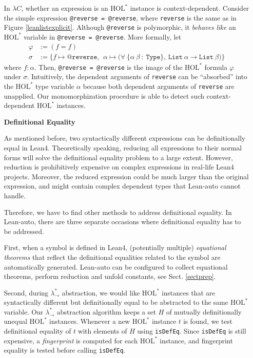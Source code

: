   In $\lambda C$, whether an expression is an $\text{HOL}^*$ instance is context-dependent.
Consider the simple expression \texttt{@reverse = @reverse}, where \texttt{reverse}
is the same as in Figure \ref{leanlistexplicit}. Although \texttt{@reverse} is polymorphic,
it \textit{behaves like} an $\text{HOL}^*$ variable in \texttt{@reverse = @reverse}. More formally,
let
$$\begin{aligned}
\varphi &:= (f = f) \\
\sigma  &:= \{f \mapsto \texttt{@reverse}, \ \ \alpha \mapsto \texttt{(} \forall \ \texttt{\{}\alpha \ \beta \ : \ \texttt{Type\}}, \ 
  \texttt{List} \ \alpha \to \texttt{List} \ \beta \texttt{)}\}
\end{aligned}$$
where $f : \alpha$. Then, \texttt{@reverse = @reverse} is the image of the $\text{HOL}^*$ formula $\varphi$
under $\sigma$. Intuitively, the dependent arguments of \texttt{reverse} can be ``absorbed''
into the $\text{HOL}^*$ type variable $\alpha$ because both dependent arguments of \texttt{reverse} are unapplied.
Our monomorphization procedure is able to detect such context-dependent $\text{HOL}^*$ instances.

\noindent \textbf{Definitional Equality}

  As mentioned before, two syntactically different expressions can be definitionally
equal in Lean4. Theoretically speaking, reducing all expressions to their normal forms will solve
the definitional equality problem to a large extent. However, reduction is prohibitively
expensive on complex expressions in real-life Lean4 projects. Moreover, the reduced expression
could be much larger than the original expression, and might contain complex dependent types
that Lean-auto cannot handle. %

  Therefore, we have to find other methods to address definitional equality.
In Lean-auto, there are three separate occasions where definitional equality
has to be addressed.

  First, when a symbol is defined in Lean4, (potentially multiple) \textit{equational theorems} that
reflect the definitional equalities related to the symbol are automatically generated.
Lean-auto can be configured to collect equational theorems, perform reduction and
unfold constants, see Sect. \ref{sectprep}.

  Second, during $\lambda_\to^*$ abstraction, we would like $\text{HOL}^*$ instances
that are syntactically different but definitionally equal to be abstracted to the
same $\text{HOL}^*$ variable. Our $\lambda_\to^*$ abstraction algorithm keeps a
set $H$ of mutually definitionally unequal $\text{HOL}^*$ instances. Whenever a new $\text{HOL}^*$
instance $t$ is found, we test definitional equality of $t$ with elements of $H$
using \texttt{isDefEq}. Since \texttt{isDefEq} is still expensive,
a \textit{fingerprint} is computed for each $\text{HOL}^*$ instance, and fingerprint equality
is tested before calling \texttt{isDefEq}.

